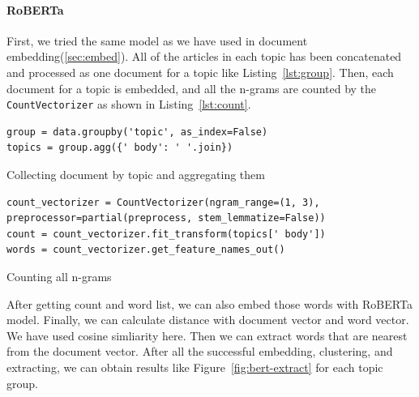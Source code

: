 \documentclass[sigconf,authorversion,nonacm]{acmart}
\begin{document}
\paragraph{RoBERTa}
First, we tried the same model as we have used in document embedding(\ref{sec:embed}).
All of the articles in each topic has been concatenated and processed as one document for a topic
like Listing~\ref{lst:group}. Then, each document for a topic is embedded, and
all the n-grams are counted by the \texttt{CountVectorizer} as shown in Listing~\ref{lst:count}.

\begin{listing}[ht]
\begin{verbatim}
group = data.groupby('topic', as_index=False)
topics = group.agg({' body': ' '.join})
\end{verbatim}
\caption{Collecting document by topic and aggregating them}
\label{lst:group}
\end{listing}

\begin{listing}[ht]
\begin{verbatim}
count_vectorizer = CountVectorizer(ngram_range=(1, 3), preprocessor=partial(preprocess, stem_lemmatize=False))
count = count_vectorizer.fit_transform(topics[' body'])
words = count_vectorizer.get_feature_names_out()
\end{verbatim}
\caption{Counting all n-grams}
\label{lst:count}
\end{listing}

After getting count and word list, we can also embed those words with RoBERTa model.
Finally, we can calculate distance with document vector and word vector.
We have used cosine simliarity here. Then we can extract words that are
nearest from the document vector.
After all the successful embedding, clustering, and extracting, we can obtain
results like Figure~\ref{fig:bert-extract} for each topic group.
\end{document}
